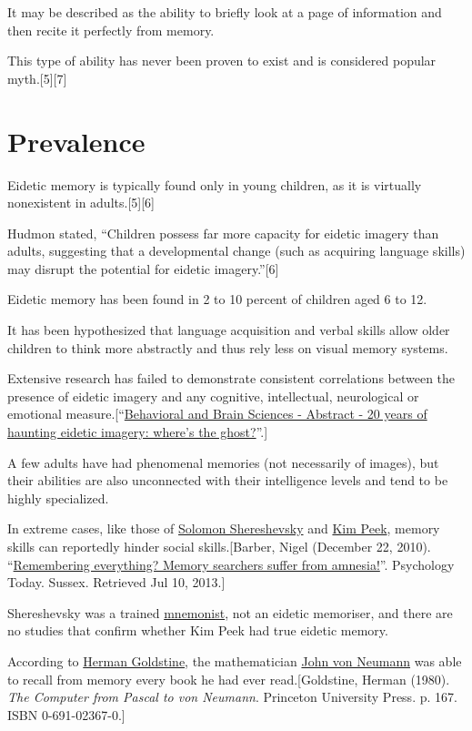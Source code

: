 \documentclass{book}
\numberwithin{equation}{section}
\begin{document}
It may be described as the ability to briefly look at a page of information and then recite it perfectly from memory.

This type of ability has never been proven to exist and is considered popular myth.[5][7]

\section{Prevalence}
Eidetic memory is typically found only in young children, as it is virtually nonexistent in adults.[5][6] 

Hudmon stated, ``Children possess far more capacity for eidetic imagery than adults, suggesting that a developmental change (such as acquiring language skills) may disrupt the potential for eidetic imagery.''[6]

Eidetic memory has been found in 2 to 10 percent of children aged 6 to 12.

It has been hypothesized that language acquisition and verbal skills allow older children to think more abstractly and thus rely less on visual memory systems.

Extensive research has failed to demonstrate consistent correlations between the presence of eidetic imagery and any cognitive, intellectual, neurological or emotional measure.[``\href{http://journals.cambridge.org/action/displayAbstract?fromPage=online&aid=7176716}{Behavioral and Brain Sciences - Abstract - 20 years of haunting eidetic imagery: where's the ghost?}''.]

%
A few adults have had phenomenal memories (not necessarily of images), but their abilities are also unconnected with their intelligence levels and tend to be highly specialized.

In extreme cases, like those of \href{https://en.wikipedia.org/wiki/Solomon_Shereshevsky}{Solomon Shereshevsky} and \href{https://en.wikipedia.org/wiki/Kim_Peek}{Kim Peek}, memory skills can reportedly hinder social skills.[Barber, Nigel (December 22, 2010). ``\href{http://www.psychologytoday.com/blog/the-human-beast/201012/remembering-everything}{Remembering everything? Memory searchers suffer from amnesia!}''. Psychology Today. Sussex. Retrieved Jul 10, 2013.]

Shereshevsky was a trained \href{https://en.wikipedia.org/wiki/Mnemonist}{mnemonist}, not an eidetic memoriser, and there are no studies that confirm whether Kim Peek had true eidetic memory.

%
According to \href{https://en.wikipedia.org/wiki/Herman_Goldstine}{Herman Goldstine}, the mathematician \href{https://en.wikipedia.org/wiki/John_von_Neumann}{John von Neumann} was able to recall from memory every book he had ever read.[Goldstine, Herman (1980). \textit{The Computer from Pascal to von Neumann}. Princeton University Press. p. 167. ISBN 0-691-02367-0.]
\end{document}
